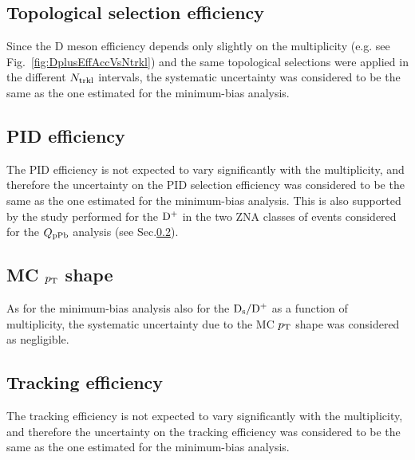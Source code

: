 \subsection{Topological selection efficiency}
\label{sec:CutVarsyst}
Since the D meson efficiency depends only slightly on the multiplicity 
(e.g. see Fig.~\ref{fig:DplusEffAccVsNtrkl}) and the same topological 
selections were applied in the different $N_{\rm trkl}$ intervals, the systematic 
uncertainty was considered to be the same as the one estimated for the minimum-bias analysis.

\subsection{PID efficiency}
\label{sec:PIDsyst}
The PID efficiency is not expected to vary significantly with the 
multiplicity, and therefore the uncertainty on the PID selection efficiency 
was considered to be the same as the one estimated for the minimum-bias 
analysis. This is also supported by the study performed for the ${\rm D^+}$
 in the two ZNA classes of events considered for the $Q_{\rm pPb}$ analysis (see Sec.\ref{sec:PIDsyst}).

\subsection{MC $p_{\rm T}$ shape}
\label{sec:MCShapesyst}
As for the minimum-bias analysis also for the ${\rm D_s}/{\rm D^+}$ as a function 
of multiplicity, the systematic uncertainty due to the MC $p_{\rm T}$ shape was considered as negligible.

\subsection{Tracking efficiency}
\label{sec:TrackSyst}
The tracking efficiency is not expected to vary significantly with the 
multiplicity, and therefore the uncertainty on the tracking efficiency 
was considered to be the same as the one estimated for the minimum-bias analysis.

